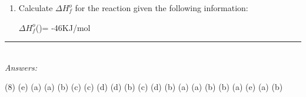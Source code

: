 \documentclass[main.tex]{subfiles}
\begin{document}
\begin{fullwidth}
\begin{multicols}{2}
\begin{enumerate}[resume]
\item Calculate $\Delta H^o_f$ for the reaction given the following information:
	\begin{center}\end{center}	
$\Delta H^o_f$()= -46KJ/mol
\begin{enumerate}[label=(\alph*)]\vspace{-0.5cm}
\end{enumerate}\vspace{-0.5cm}












 \end{enumerate}
\end{multicols}
\end{fullwidth}
\begin{fullwidth}
\par\noindent\rule{0.5\textwidth}{0.4pt}\\
\emph{Answers:}\\
\vspace{-0.5cm}
\begin{tasks}[counter-format={tsk[1].}, label-align=left, label-offset={0mm}, label-width={5mm}, item-indent={1mm}, label-format={\bfseries}](8)
\task (e) 
\task (a) 
\task (a) 
\task (b) 
\task (c) 
\task (c) 
\task (d)
\task (d) 
\task (b) 
\task (c)
\task (d)
\task (b)
\task (a)
\task (a)
\task (b)
\task (b)
\task (a)
\task (e)
\task (a)
\task (b)





\end{tasks}






\end{fullwidth}
\restoregeometry
\end{document}
